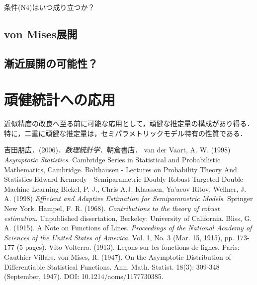 \documentclass[uplatex, dvipdfmx]{jsarticle}
\begin{document}
条件(N4)はいつ成り立つか？

\subsection{von Mises展開}

\subsection{漸近展開の可能性？}

\section{頑健統計への応用}

\begin{tcolorbox}[colframe=ForestGreen, colback=ForestGreen!10!white,breakable,colbacktitle=ForestGreen!40!white,coltitle=black,fonttitle=\bfseries\sffamily,
title=]
    近似精度の改良へ至る前に可能な応用として，頑健な推定量の構成があり得る．特に，二重に頑健な推定量は，セミパラメトリックモデル特有の性質である．
\end{tcolorbox}

\begin{thebibliography}{99}
    吉田朋広．(2006)．\textit{数理統計学}．朝倉書店．
    van der Vaart, A. W. (1998) \textit{Asymptotic Statistics}. Cambridge Series in Statistical and Probabilistic Mathematics, Cambridge.
    Bolthausen - Lectures on Probability Theory And Statistics
    Edward Kennedy - Semiparametric Doubly Robust Targeted Double Machine Learning
    Bickel, P. J., Chris A.J. Klaassen, Ya'acov Ritov, Wellner, J. A. (1998) \textit{Efficient and Adaptive Estimation for Semiparametric Models}. Springer New York.
    Hampel, F. R. (1968). \textit{Contributions to the theory of robust estimation}. Unpublished dissertation, Berkeley: University of California.
    Bliss, G. A. (1915). A Note on Functions of Lines. \textit{Proceedings of the National Academy of Sciences of the United States of America}. Vol. 1, No. 3 (Mar. 15, 1915), pp. 173-177 (5 pages).
    Vito Volterra. (1913). Le\c{c}ons sur les fonctions de lignes. Paris: Gauthier-Villars.
    von Mises, R. (1947). On the Asymptotic Distribution of Differentiable Statistical Functions.  Ann. Math. Statist. 18(3): 309-348 (September, 1947). DOI: 10.1214/aoms/1177730385.
\end{thebibliography}
\end{document}
